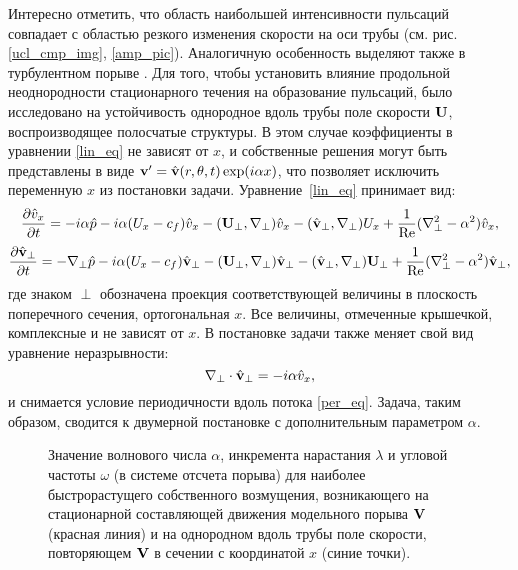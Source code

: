 Интересно отметить, что область наибольшей интенсивности пульсаций совпадает с областью резкого изменения скорости на оси трубы (см. рис. \ref{ucl_cmp_img}, \ref{amp_pic}). Аналогичную особенность выделяют также в турбулентном порыве \cite{Hof2010}. Для того, чтобы установить влияние продольной неоднородности стационарного течения на образование пульсаций, было исследовано на устойчивость однородное вдоль трубы поле скорости $\mathbf{U}$, воспроизводящее полосчатые структуры. В этом случае коэффициенты в уравнении \eqref{lin_eq} не зависят от $x$, и собственные решения могут быть представлены в виде $\mathbf{v}' = \hat {\mathbf{v}}(r,\theta,t) \exp(i \alpha x)$, что позволяет исключить переменную $x$ из постановки задачи. Уравнение~\eqref{lin_eq} принимает вид:
\begin{multline*}
\frac{\partial \hat v_x}{\partial t} = - i \alpha \hat p - i \alpha (U_x - c_f) \hat v_x - (\mathbf{U}_{\perp},\nabla_{\perp}) \hat v_x - 
(\hat {\mathbf{v}}_{\perp}, \nabla_{\perp}) U_x + \frac{1}{\operatorname{Re}}( \nabla_{\perp}^2 - \alpha^2 ) \hat v_x,
\end{multline*}
\begin{multline*}
\frac{\partial \hat {\mathbf{v}}_{\perp}}{\partial t} =  - \nabla_{\perp} \hat p - i \alpha (U_x - c_f) \hat {\mathbf{v}}_{\perp} - (\mathbf{U}_{\perp},\nabla_{\perp}) \hat {\mathbf{v}}_{\perp} - (\hat {\mathbf{v}}_{\perp}, \nabla_{\perp}) \mathbf{U}_{\perp} + \frac{1}{\operatorname{Re}}( \nabla_{\perp}^2 - \alpha^2 ) \hat {\mathbf{v}}_{\perp}, 
\end{multline*}
где знаком $\perp$ обозначена проекция соответствующей величины в плоскость поперечного сечения, ортогональная $x$. Все величины, отмеченные крышечкой, комплексные и не зависят от $x$. В постановке задачи также меняет свой вид уравнение неразрывности:
\begin{equation*}
\nabla_{\perp} \cdot \hat {\mathbf{v}}_{\perp} = - i \alpha \hat v_x, 
\end{equation*}
и снимается условие периодичности вдоль потока \eqref{per_eq}. Задача, таким образом, сводится к двумерной постановке с дополнительным параметром $\alpha$. 

\begin{figure}
\caption{Значение волнового числа $\alpha$, инкремента нарастания $\lambda$ и угловой частоты $\omega$ (в системе отсчета порыва) для наиболее быстрорастущего собственного возмущения, возникающего на стационарной составляющей движения модельного порыва $\mathbf{V}$ (красная линия) и на однородном вдоль трубы поле скорости, повторяющем $\mathbf{V}$ в сечении с координатой $x$ (синие точки).}
\label{cs_lin_pic}
\end{figure}

